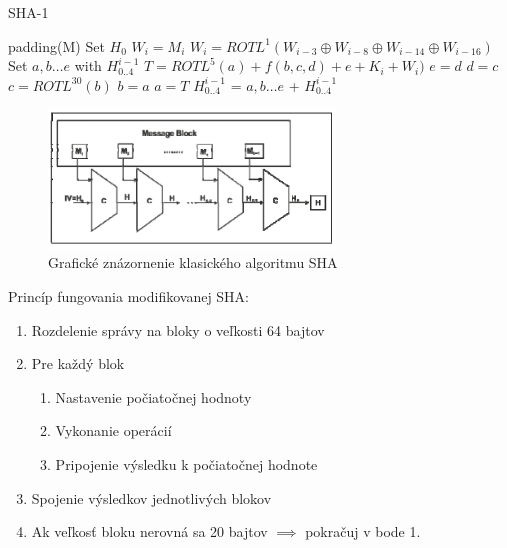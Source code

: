 \documentclass[conference]{IEEEtran}
\begin{document}
\begin{algorithm}
   \caption{SHA-1 \cite{sha-algo}}
    \begin{algorithmic}[1]

        \State padding(M) 
        \State  Set ${H_0}$ 
     	 
     			\State $W_i = M_i$
     		\EndFor
     			\State $W_i = ROTL^1(W_{i-3} \oplus W_{i-8} \oplus W_{i-14} \oplus W_{i-16})$
     		\EndFor
		\State Set ${a, b \ldots e}$ with ${H_{0..4}^{i-1}}$
		 
			\State  $T = ROTL^5(a) + f(b,c,d) + e + K_i + W_i)$
			\State  $e = d$
			\State  $d = c$
			\State  $c = ROTL^{30}(b)$
			\State  $b = a$
			\State  $a = T$
     		\EndFor		
     	\EndFor
   	\State ${H_{0..4}^{i-1}}$ = ${a, b \ldots e}$ + ${H_{0..4}^{i-1}}$
       \EndFunction
\end{algorithmic}
\end{algorithm}


\begin{figure}[!h]
\centering
\includegraphics[width=3in]{img/SHA}
\caption{Grafické znázornenie klasického algoritmu SHA}
\end{figure}

Princíp fungovania modifikovanej SHA: 
\begin{enumerate}
	\item{Rozdelenie správy na bloky o veľkosti 64 bajtov}
	\item{Pre každý blok}
	\begin{enumerate}
		\item{Nastavenie počiatočnej hodnoty}
		\item{Vykonanie operácií}
		\item{Pripojenie výsledku k počiatočnej hodnote}
	\end{enumerate}
	\item{Spojenie výsledkov jednotlivých blokov}
	\item{Ak veľkosť bloku nerovná sa 20 bajtov $\implies$ pokračuj v bode 1.}
\end{enumerate}
\end{document}
